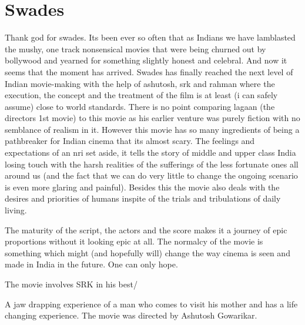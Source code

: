 \documentclass{article}
\begin{document}
\section*{Swades}


Thank god for swades. Its been ever so often that as Indians we have lamblasted the mushy, one track nonsensical movies that were being churned out by bollywood and yearned for something slightly honest and celebral. And now it seems that the moment has arrived. Swades has finally reached the next level of Indian movie-making with the help of ashutosh, srk and rahman where the execution, the concept and the treatment of the film is at least (i can safely assume) close to world standards. There is no point comparing lagaan (the directors 1st movie) to this movie as his earlier venture was purely fiction with no semblance of realism in it. However this movie has so many ingredients of being a pathbreaker for Indian cinema that its almost scary. The feelings and expectations of an nri set aside, it tells the story of middle and upper class India losing touch with the harsh realities of the sufferings of the less fortunate ones all around us (and the fact that we can do very little to change the ongoing scenario is even more glaring and painful). Besides this the movie also deals with the desires and priorities of humans inspite of the trials and tribulations of daily living.

The maturity of the script, the actors and the score makes it a journey of epic proportions without it looking epic at all. The normalcy of the movie is something which might (and hopefully will) change the way cinema is seen and made in India in the future. One can only hope.

The movie involves SRK in his best/

A jaw drapping experience of a man who comes to visit his mother and has a life changing experience.
The movie was directed by Ashutosh Gowarikar.
\end{document}
